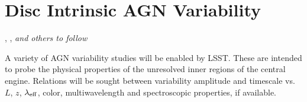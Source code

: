 %
%
%
%
%
%
%

\section{Disc Intrinsic AGN Variability}
\def\secname{\chpname:variability}\label{sec:\secname}

,
,
{\it and others to follow}



A variety of AGN variability studies will be enabled by LSST. These are
intended to probe the physical properties of the unresolved inner regions
of the central engine. Relations will be sought between variability amplitude
and timescale vs. $L$, $z$, $\lambda_{\rm eff}$, color, multiwavelength and
spectroscopic properties, if available.

